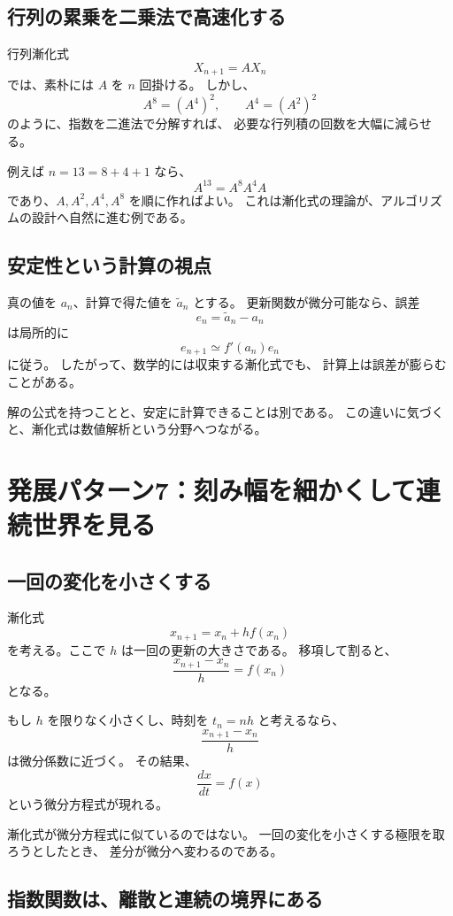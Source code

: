 \subsection{行列の累乗を二乗法で高速化する}

行列漸化式
\[
  X_{n+1}=AX_n
\]
では、素朴には $A$ を $n$ 回掛ける。
しかし、
\[
  A^8=(A^4)^2,\qquad
  A^4=(A^2)^2
\]
のように、指数を二進法で分解すれば、
必要な行列積の回数を大幅に減らせる。

例えば $n=13=8+4+1$ なら、
\[
  A^{13}=A^8A^4A
\]
であり、$A,A^2,A^4,A^8$ を順に作ればよい。
これは漸化式の理論が、アルゴリズムの設計へ自然に進む例である。

\subsection{安定性という計算の視点}

真の値を $a_n$、計算で得た値を $\widetilde a_n$ とする。
更新関数が微分可能なら、誤差
\[
  e_n=\widetilde a_n-a_n
\]
は局所的に
\[
  e_{n+1}\simeq f'(a_n)e_n
\]
に従う。
したがって、数学的には収束する漸化式でも、
計算上は誤差が膨らむことがある。

解の公式を持つことと、安定に計算できることは別である。
この違いに気づくと、漸化式は数値解析という分野へつながる。

\section{発展パターン7：刻み幅を細かくして連続世界を見る}

\subsection{一回の変化を小さくする}

漸化式
\[
  x_{n+1}=x_n+h f(x_n)
\]
を考える。ここで $h$ は一回の更新の大きさである。
移項して割ると、
\[
  \frac{x_{n+1}-x_n}{h}=f(x_n)
\]
となる。

もし $h$ を限りなく小さくし、時刻を $t_n=nh$ と考えるなら、
\[
  \frac{x_{n+1}-x_n}{h}
\]
は微分係数に近づく。
その結果、
\[
  \frac{dx}{dt}=f(x)
\]
という微分方程式が現れる。

漸化式が微分方程式に似ているのではない。
一回の変化を小さくする極限を取ろうとしたとき、
差分が微分へ変わるのである。

\subsection{指数関数は、離散と連続の境界にある}

